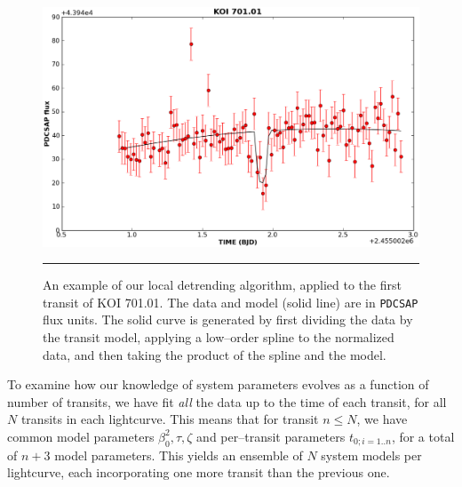 \begin{figure}[t] 
  \begin{minipage}[c]{0.6\textwidth}
    \includegraphics[width=\textwidth]{figures/701.01.eps}
  \end{minipage}\hfill
  \begin{minipage}[c]{0.4\textwidth}
    \caption{An example of our local detrending algorithm, applied to
      the first transit of KOI 701.01.  The data and model (solid
      line) are in {\tt PDCSAP} flux units.  The solid curve is
      generated by first dividing the data by the transit model,
      applying a low--order spline to the normalized data, and then
      taking the product of the spline and the model.}
    \label{fig-koi70101}
    \hspace*{\fill}  
    \hrule
  \end{minipage}
\end{figure}

\medskip
{\centerline{}}
\smallskip

To examine how our knowledge of system parameters evolves as a
function of number of transits, we have fit {\it all} the data up to
the time of each transit, for all $N$ transits in each lightcurve.
This means that for transit $n \leq N$, we have common model
parameters $\beta_{0}^2, \tau, \zeta$ and per--transit parameters
$t_{0;i=1..n}$, for a total of $n+3$ model parameters.  This yields an
ensemble of $N$ system models per lightcurve, each incorporating one
more transit than the previous one.

